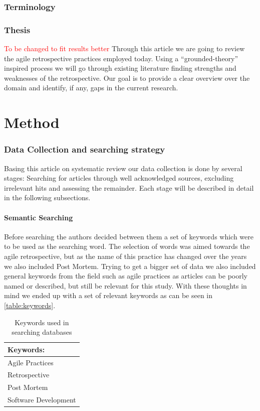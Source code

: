 \documentclass[12pt]{article}
\newcommand\todo[1]{\textcolor{red}{#1}}
\begin{document}
\section{Terminology}

\section{Thesis}
\todo{To be changed to fit results better}
Through this article we are going to review the agile retrospective practices employed today. Using a ``grounded-theory'' inspired process we will go through existing literature finding strengths and weaknesses of the retrospective. Our goal is to provide a clear overview over the domain and identify, if any, gaps in the current research. 

\clearpage

\part{Method}

\section{Data Collection and searching strategy}
Basing this article on systematic review our data collection is done by several stages: Searching for articles through well acknowledged sources, excluding irrelevant hits and assessing the remainder. Each stage will be described in detail in the following subsections.

\subsection{Semantic Searching}
Before searching the authors decided between them a set of keywords which were to be used as the searching word. The selection of words was aimed towards the agile retrospective, but as the name of this practice has changed over the years we also included Post Mortem. Trying to get a bigger set of data we also included general keywords from the field such as agile practices as articles can be poorly named or described, but still be relevant for this study. With these thoughts in mind we ended up with a set of relevant keywords as can be seen in \autoref{table:keywords}.

\begin{table}[!h]
	\begin{center}
		\caption{Keywords used in searching databases}
		\label{table:keywords}
		\begin{tabular}{ l }
			Keywords: \\ \hline
			Agile Practices \\
			Retrospective \\
			Post Mortem \\
			Software Development \\
		\end{tabular}
	\end{center}
\end{table}
\end{document}

